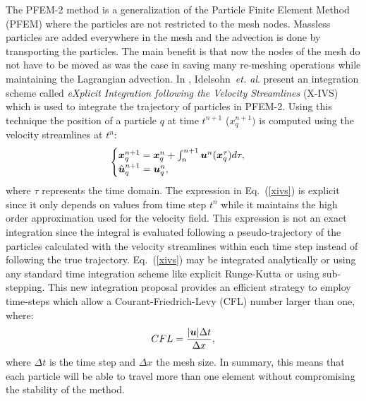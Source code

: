 The PFEM-2 method is a generalization of the Particle Finite Element Method (PFEM) \cite{sergio:pfem} where the particles are not restricted to the mesh nodes. Massless particles are added everywhere in the mesh and the advection is done by transporting the particles. The main benefit is that now the nodes of the mesh do not have to be moved as was the case in \cite{sergio:pfem} saving many re-meshing operations while maintaining the Lagrangian advection. In \cite{sergio:xivs1}, Idelsohn~{\sl et. al}. present an integration scheme called {\em eXplicit Integration following the Velocity Streamlines} (X-IVS) which is used to integrate the trajectory of particles in PFEM-2. Using this technique the position of a particle $q$ at time $t^{n+1}$ ($x_q^{n+1})$ is computed using the velocity streamlines at $t^n$:
%
\begin{equation}\label{xivs}
  \begin{cases}
    \boldsymbol{x}_q^{n+1}=\boldsymbol{x}_q^n+\int_n^{n+1} \boldsymbol{u}^n(\boldsymbol{x}_q^\tau) d\tau,\\
    \hat{\boldsymbol{u}}^{n+1}_q=\boldsymbol{u}_q^n,
  \end{cases}
\end{equation}
where $\tau$ represents the time domain.
%
The expression in Eq.~(\ref{xivs}) is explicit since it only depends on values from time step $t^n$ while it maintains the high order approximation used for the velocity field. This expression is not an exact integration since the integral is evaluated following a pseudo-trajectory of the particles calculated with the velocity streamlines within each time step instead of following the true trajectory. Eq.~(\ref{xivs}) may be integrated analytically or using any standard time integration scheme like explicit Runge-Kutta or using sub-stepping. This new integration proposal provides an efficient strategy to employ time-steps which allow a Courant-Friedrich-Levy (CFL) number larger than one, where:
%
\begin{equation}
  CFL=\frac{|\boldsymbol{u}|\Delta t}{\Delta x},
\end{equation}
where $\Delta t$ is the time step and $\Delta x$ the mesh size.
%
In summary, this means that each particle will be able to travel more than one element without compromising the stability of the method.

